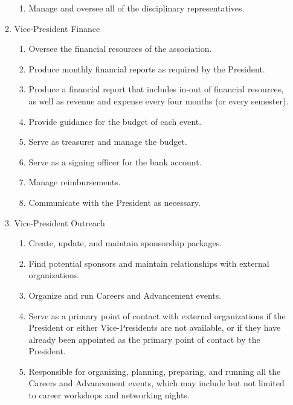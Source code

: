 \documentclass[12pt,a4paper]{article}
\begin{document}
\begin{enumerate}
\begin{enumerate}
\begin{enumerate}
\item Manage and oversee all of the disciplinary representatives.
\end{enumerate}

\item Vice-President Finance

\begin{enumerate}
\item Oversee the financial resources of the association.

\item Produce monthly financial reports as required by the President.

\item Produce a financial report that includes in-out of financial resources, as well as revenue and expense every four months (or every semester).

\item Provide guidance for the budget of each event.

\item Serve as treasurer and manage the budget.

\item Serve as a signing officer for the bank account.

\item Manage reimbursements.

\item Communicate with the President as necessary.
\end{enumerate}

\item Vice-President Outreach

\begin{enumerate}
\item Create, update, and maintain sponsorship packages.

\item Find potential sponsors and maintain relationships with external organizations.

\item Organize and run Careers and Advancement events.

\item Serve as a primary point of contact with external organizations if the President or either Vice-Presidents are not available, or if they have already been appointed as the primary point of contact by the President.

\item Responsible for organizing, planning, preparing, and running all the Careers and Advancement events, which may include but not limited to career workshops and networking nights.


\end{enumerate}
\end{enumerate}
\end{enumerate}
\end{document}

